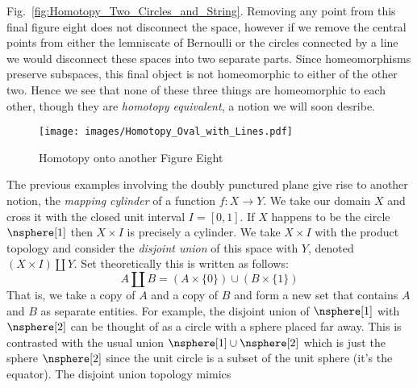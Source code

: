 \documentclass{book}                                                           %
\begin{document}
                Fig.~\ref{fig:Homotopy_Two_Circles_and_String}. Removing
                any point from this final figure eight does not disconnect the
                space, however if we remove the central points from either the
                lemniscate of Bernoulli or the circles connected by a line we
                would disconnect these spaces into two separate parts. Since
                homeomorphisms preserve subspaces, this final object is not
                homeomorphic to either of the other two. Hence we see that none
                of these three things are homeomorphic to each other, though
                they are \textit{homotopy equivalent}, a notion we will soon
                desribe.
                \begin{figure}[H]
                    \centering
                    \captionsetup{type=figure}
                    \texttt{[image: images/Homotopy\_Oval\_with\_Lines.pdf]}
                    \caption{Homotopy onto another Figure Eight}
                    \label{fig:Homotopy_Oval_with_Line}
                \end{figure}
                The previous examples involving the doubly punctured plane give
                rise to another notion, the \textit{mapping cylinder} of a
                function $f:X\rightarrow{Y}$. We take our domain $X$ and cross
                it with the closed unit interval $I=[0,1]$. If $X$ happens to be
                the circle $\nsphere[1]$ then $X\times{I}$ is precisely a
                cylinder. We take $X\times{I}$ with the product topology and
                consider the \textit{disjoint union} of this space with $Y$,
                denoted $(X\times{I})\coprod{Y}$. Set theoretically this is
                written as follows:
                \begin{equation}
                    \label{eqn:Def_Disjoint_Union}%
                    A\coprod{B}=(A\times\{0\})\cup(B\times\{1\})
                \end{equation}
                That is, we take a copy of $A$ and a copy of $B$ and form a
                new set that contains $A$ and $B$ as separate entities. For
                example, the disjoint union of $\nsphere[1]$ with $\nsphere[2]$
                can be thought of as a circle with a sphere placed far away.
                This is contrasted with the usual union
                $\nsphere[1]\cup\nsphere[2]$ which is just the sphere
                $\nsphere[2]$ since the unit circle is a subset of the unit
                sphere (it's the equator). The disjoint union topology mimics
\end{document}
